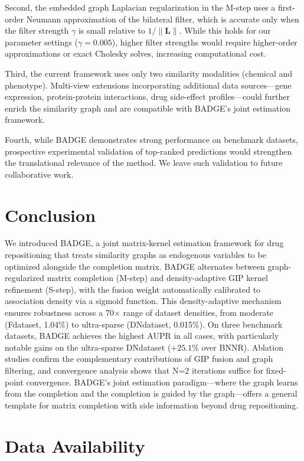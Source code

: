 \documentclass{oup-authoring-template}
\begin{document}
Second, the embedded graph Laplacian regularization in the M-step uses a first-order Neumann approximation of the bilateral filter, which is accurate only when the filter strength $\gamma$ is small relative to $1/\|\mathbf{L}\|$. While this holds for our parameter settings ($\gamma = 0.005$), higher filter strengths would require higher-order approximations or exact Cholesky solves, increasing computational cost.

Third, the current framework uses only two similarity modalities (chemical and phenotype). Multi-view extensions incorporating additional data sources---gene expression, protein-protein interactions, drug side-effect profiles---could further enrich the similarity graph and are compatible with BADGE's joint estimation framework.

Fourth, while BADGE demonstrates strong performance on benchmark datasets, prospective experimental validation of top-ranked predictions would strengthen the translational relevance of the method. We leave such validation to future collaborative work.

\section{Conclusion}

We introduced BADGE, a joint matrix-kernel estimation framework for drug repositioning that treats similarity graphs as endogenous variables to be optimized alongside the completion matrix. BADGE alternates between graph-regularized matrix completion (M-step) and density-adaptive GIP kernel refinement (S-step), with the fusion weight automatically calibrated to association density via a sigmoid function. This density-adaptive mechanism ensures robustness across a 70$\times$ range of dataset densities, from moderate (Fdataset, 1.04\%) to ultra-sparse (DNdataset, 0.015\%). On three benchmark datasets, BADGE achieves the highest AUPR in all cases, with particularly notable gains on the ultra-sparse DNdataset ($+25.1\%$ over BNNR). Ablation studies confirm the complementary contributions of GIP fusion and graph filtering, and convergence analysis shows that N=2 iterations suffice for fixed-point convergence. BADGE's joint estimation paradigm---where the graph learns from the completion and the completion is guided by the graph---offers a general template for matrix completion with side information beyond drug repositioning.

\section*{Data Availability}
\end{document}

